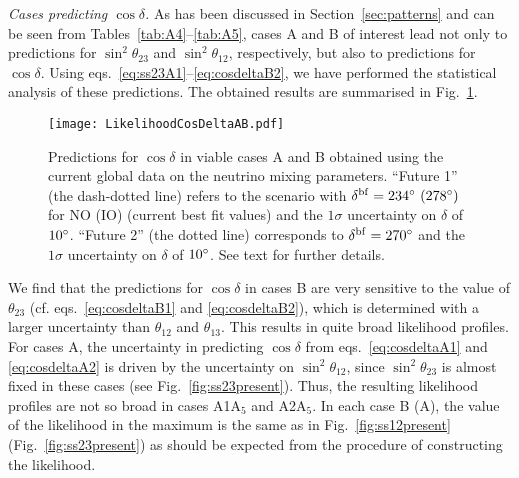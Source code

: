 \documentclass[11pt,a4paper]{article}
\def\th{\theta}
\numberwithin{equation}{section}
\begin{document}
 \textit{Cases predicting $\cos\delta$.} 
As has been discussed in Section~\ref{sec:patterns} 
and can be seen from Tables~\ref{tab:A4}--\ref{tab:A5}, 
cases A and B of interest lead not only to predictions for 
$\sin^2\th_{23}$ and $\sin^2\th_{12}$, respectively, but also to 
predictions for $\cos\delta$. 
Using eqs.~\eqref{eq:ss23A1}--\eqref{eq:cosdeltaB2}, we have performed 
the statistical analysis of these predictions. 
The obtained results are summarised in Fig.~\ref{fig:cosdeltaABpresent}.
\begin{figure}
\centering
\texttt{[image: LikelihoodCosDeltaAB.pdf]}
\caption{Predictions for $\cos\delta$ in viable cases A and B 
obtained using the current global data on 
the neutrino mixing parameters. 
``Future 1'' (the dash-dotted line) refers to the scenario with $\delta^\mathrm{bf} = 234\degree~(278\degree)$ for NO (IO) (current best fit values) 
and the $1\sigma$ uncertainty on $\delta$ of $10\degree$. 
``Future 2'' (the dotted line) corresponds to $\delta^\mathrm{bf} = 270\degree$ and 
the $1\sigma$ uncertainty on $\delta$ of $10\degree$. 
See text for further details.}
\label{fig:cosdeltaABpresent}
\end{figure}
%
We find that the predictions for $\cos\delta$ in cases B are very sensitive to 
the value of $\th_{23}$ (cf. eqs.~\eqref{eq:cosdeltaB1} 
and \eqref{eq:cosdeltaB2}), which is 
determined with a larger uncertainty than $\th_{12}$ and $\th_{13}$.
This results in quite broad likelihood profiles.
For cases A, the uncertainty in predicting $\cos\delta$ 
from eqs.~\eqref{eq:cosdeltaA1} and \eqref{eq:cosdeltaA2} is driven by 
the uncertainty on $\sin^2\th_{12}$,  
since $\sin^2\th_{23}$ is almost fixed in these cases 
(see Fig.~\ref{fig:ss23present}). 
Thus, the resulting likelihood profiles are not so broad in cases 
A1A$_5$ and A2A$_5$.
In each case B (A), the value of the likelihood in the maximum is the same as 
in Fig.~\ref{fig:ss12present} (Fig.~\ref{fig:ss23present}) as should 
be expected from the procedure of constructing the likelihood.
\end{document}
